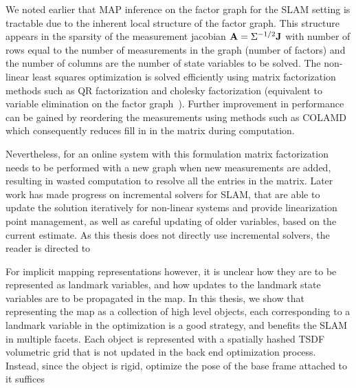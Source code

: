We noted earlier that MAP inference on the factor graph for the SLAM setting is tractable due to the inherent local structure of the factor graph. This structure appears in the sparsity of the measurement jacobian $\mathbf{A} = \Sigma^{-1/2} \mathbf{J}$ with number of rows equal to the number of measurements in the graph (number of factors) and the number of columns are the number of state variables to be solved. The non-linear least squares optimization is solved efficiently using matrix factorization methods such as QR factorization and cholesky factorization (equivalent to variable elimination on the factor graph~\cite{dellaertSquareRootSAM2006}). Further improvement in performance can be gained by reordering the measurements using methods such as COLAMD \cite{davisAlgorithm8xxCOLAMD} which consequently reduces fill in in the matrix during computation.

Nevertheless, for an online system with this formulation matrix factorization needs to be performed with a new graph when new measurements are added, resulting in wasted computation to resolve all the entries in the matrix. Later work has made progress on incremental solvers for SLAM, that are able to update the solution iteratively for non-linear systems and provide linearization point management, as well as careful updating of older variables, based on the current estimate. As this thesis does not directly use incremental solvers, the reader is directed to \citet{kaessISAM2IncrementalSmoothing2012}

For implicit mapping representations however, it is unclear how they are to be represented as landmark variables, and how updates to the landmark state variables are to be propagated in the map. In this thesis, we show that representing the map as a collection of high level objects, each corresponding to a landmark variable in the optimization is a good strategy, and benefits the SLAM in multiple facets. Each object is represented with a spatially hashed TSDF volumetric grid \cite{prisacariuInfiniTAMV3Framework2017} \cite{niessnerRealtime3DReconstruction2013} \cite{dongGPUAcceleratedRobust2019} that is not updated in the back end optimization process. Instead, since the object is rigid, optimize the pose of the base frame attached to it suffices



